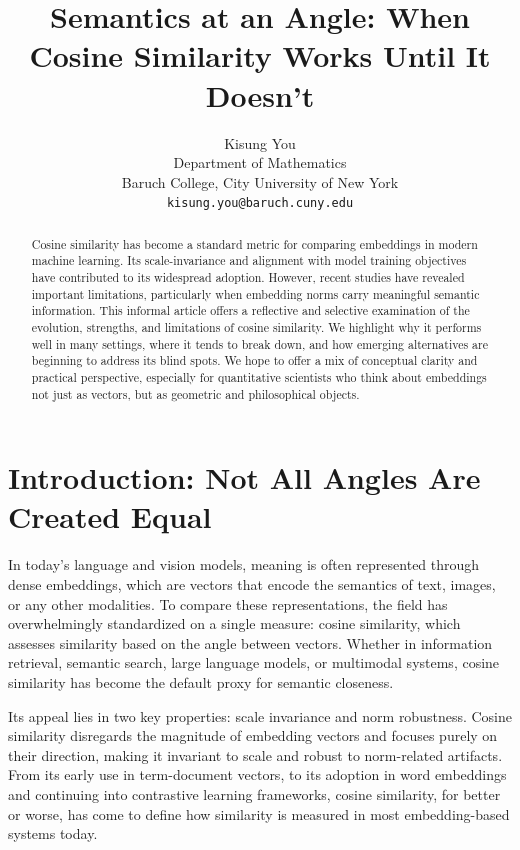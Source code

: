 \documentclass[11pt]{article}
\title{Semantics at an Angle: When Cosine Similarity Works Until It Doesn't}
\author{Kisung You \\
	Department of Mathematics \\
	Baruch College, City University of New York\\
  {\tt kisung.you@baruch.cuny.edu} }
\date{}
\begin{document}
\maketitle

\begin{abstract}
Cosine similarity has become a standard metric for comparing embeddings in modern machine learning. Its scale-invariance and alignment with model training objectives have contributed to its widespread adoption. However, recent studies have revealed important limitations, particularly when embedding norms carry meaningful semantic information. This informal article offers a reflective and selective examination of the evolution, strengths, and limitations of cosine similarity. We highlight why it performs well in many settings, where it tends to break down, and how emerging alternatives are beginning to address its blind spots. We hope to offer a mix of conceptual clarity and practical perspective, especially for quantitative scientists who think about embeddings not just as vectors, but as geometric and philosophical objects.
\end{abstract}

\section{Introduction: Not All Angles Are Created Equal}

In today's language and vision models, meaning is often represented through dense embeddings, which are vectors that encode the semantics of text, images, or any other modalities. To compare these representations, the field has overwhelmingly standardized on a single measure: cosine similarity, which assesses similarity based on the angle between vectors. Whether in information retrieval, semantic search, large language models, or multimodal systems, cosine similarity has become the default proxy for semantic closeness.

Its appeal lies in two key properties: scale invariance and norm robustness. Cosine similarity disregards the magnitude of embedding vectors and focuses purely on their direction, making it invariant to scale and robust to norm-related artifacts. From its early use in term-document vectors, to its adoption in word embeddings and continuing into contrastive learning frameworks, cosine similarity, for better or worse, has come to define how similarity is measured in most embedding-based systems today.
\end{document}
